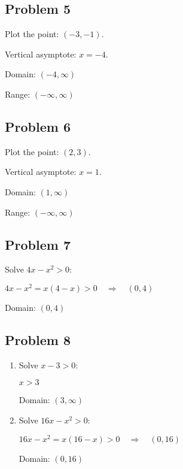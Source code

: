 \documentclass[12pt]{article}
\begin{document}
\subsection*{Problem 5}
Plot the point: \((-3,-1)\).

\noindent Vertical asymptote: \(x=-4\).

\noindent Domain: \(\boxed{(-4,\infty)}\)  

\noindent Range: \(\boxed{(-\infty,\infty)}\)

\subsection*{Problem 6}
Plot the point: \((2,3)\).

\noindent Vertical asymptote: \(x=1\).

\noindent Domain: \(\boxed{(1,\infty)}\)  

\noindent Range: \(\boxed{(-\infty,\infty)}\)

\subsection*{Problem 7}
Solve \(4x - x^2 > 0\):

\noindent\(4x - x^2 = x(4 - x) > 0 \quad\Rightarrow\quad (0,4)\)

\noindent Domain: \(\boxed{(0,4)}\)

\subsection*{Problem 8}
\begin{enumerate}[label=(\alph*)]
  \item Solve \(x - 3 > 0\):

\noindent\(x > 3\)

\noindent Domain: \(\boxed{(3,\infty)}\)

  \item Solve \(16x - x^2 > 0\):

\noindent\(16x - x^2 = x(16 - x) > 0 \quad\Rightarrow\quad (0,16)\)

\noindent Domain: \(\boxed{(0,16)}\)
\end{enumerate}
\end{document}
